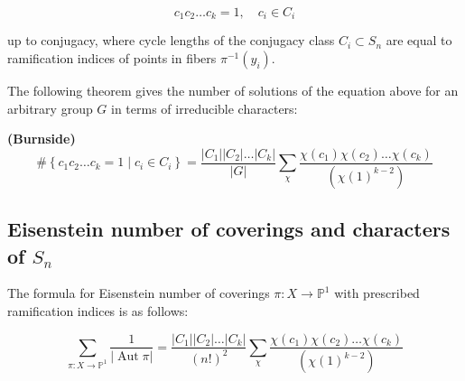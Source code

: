 \begin{equation*}
c_{1} c_{2} \ldots c_{k}=1, \quad c_{i} \in C_{i} 
\end{equation*}

up to conjugacy, where cycle lengths of the conjugacy class $C_{i} \subset S_{n}$ are equal to ramification indices of points in fibers $\pi^{-1}\left(y_{i}\right)$.

The following theorem gives the number of solutions of the equation above for an arbitrary group $G$ in terms of irreducible characters:

\begin{thm} {\bf (Burnside)}
\begin{equation*}
\#\left\{c_{1} c_{2} \ldots c_{k}=1 \mid c_{i} \in C_{i}\right\}=\frac{\left|C_{1}\right|\left|C_{2}\right| \ldots\left|C_{k}\right|}{|G|} \sum_{\chi} \frac{\chi\left(c_{1}\right) \chi\left(c_{2}\right) \ldots \chi\left(c_{k}\right)}{\left(\chi(1)^{k-2}\right)} \tag{1}\label{Burnside}
\end{equation*}
\end{thm}


\subsection{Eisenstein number of coverings and characters of \texorpdfstring{$S_n$}{}}

\begin{thm}
    The formula for Eisenstein number of coverings $\pi: X \rightarrow \mathbb{P}^{1}$ with prescribed ramification indices is as follows:


\begin{equation*}
\sum_{\pi: X \rightarrow \mathbb{P}^{1}} \frac{1}{|\operatorname{Aut} \pi|}=\frac{\left|C_{1}\right|\left|C_{2}\right| \ldots\left|C_{k}\right|}{(n !)^{2}} \sum_{\chi} \frac{\chi\left(c_{1}\right) \chi\left(c_{2}\right) \ldots \chi\left(c_{k}\right)}{\left(\chi(1)^{k-2}\right)} 
\end{equation*}
\end{thm}


